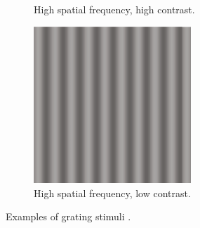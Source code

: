\begin{figure}[!htp]
\begin{subfigure}[t]{0.3\textwidth}
        \caption{High spatial frequency, high contrast.}
    \end{subfigure}
    \hspace{0.03\textwidth}
    \begin{subfigure}[t]{0.3\textwidth}
        \centering
        \includegraphics[width=0.65\textwidth]{assets/images/grating-stimuli/3.png}
        \caption{High spatial frequency, low contrast.}
    \end{subfigure}
    \caption[Grating stimuli examples]{Examples of grating stimuli \cite{KandelBook2003:26}.}
    \label{fig:grating-stimuli-examples}
\end{figure}
